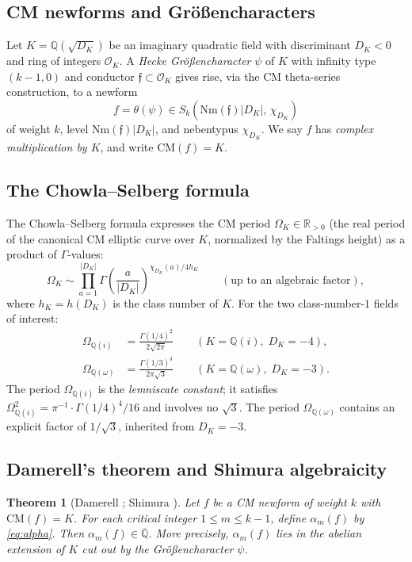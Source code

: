 \documentclass[10pt]{article}
\newtheorem{theorem}{Theorem}[section]
\theoremstyle{definition}
\newcommand{\Q}{\mathbb{Q}}
\newcommand{\R}{\mathbb{R}}
\newcommand{\OO}{\mathcal{O}}
\newcommand{\Nm}{\mathrm{Nm}}
\newcommand{\OmI}{\Omega_{\Q(i)}}
\newcommand{\OmW}{\Omega_{\Q(\omega)}}
\begin{document}
\subsection{CM newforms and Gr\"{o}{\ss}encharacters}

Let $K = \Q(\sqrt{D_K})$ be an imaginary quadratic field with discriminant $D_K < 0$
and ring of integers $\OO_K$.  A \emph{Hecke Gr\"{o}{\ss}encharacter} $\psi$ of $K$
with infinity type $(k-1, 0)$ and conductor $\mathfrak{f} \subset \OO_K$ gives rise,
via the CM theta-series construction, to a newform
\[
  f = \theta(\psi) \in S_k\!\left(\Nm(\mathfrak{f})|D_K|,\, \chi_{D_K}\right)
\]
of weight $k$, level $\Nm(\mathfrak{f})|D_K|$, and nebentypus $\chi_{D_K}$.
We say $f$ has \emph{complex multiplication by $K$}, and write $\mathrm{CM}(f) = K$.

\subsection{The Chowla--Selberg formula}

The Chowla--Selberg formula \cite{CS67} expresses the CM period $\Omega_K \in \R_{>0}$
(the real period of the canonical CM elliptic curve over $K$, normalized by the Faltings
height) as a product of $\Gamma$-values:
\[
  \Omega_K \sim \prod_{a=1}^{|D_K|}
    \Gamma\!\left(\frac{a}{|D_K|}\right)^{\chi_{D_K}(a)/4h_K}
    \qquad (\text{up to an algebraic factor}),
\]
where $h_K = h(D_K)$ is the class number of $K$.
For the two class-number-$1$ fields of interest:
\begin{align}
  \label{eq:OmegaQi}
  \OmI &= \frac{\Gamma(1/4)^2}{2\sqrt{2\pi}}
    \qquad (K = \Q(i),\; D_K = -4), \\
  \label{eq:OmegaQomega}
  \OmW &= \frac{\Gamma(1/3)^3}{2\pi\sqrt{3}}
    \qquad (K = \Q(\omega),\; D_K = -3).
\end{align}
The period $\OmI$ is the \emph{lemniscate constant}; it satisfies
$\OmI^2 = \pi^{-1}\cdot\Gamma(1/4)^4/16$ and involves no $\sqrt{3}$.
The period $\OmW$ contains an explicit factor of $1/\sqrt{3}$, inherited
from $D_K = -3$.

\subsection{Damerell's theorem and Shimura algebraicity}

\begin{theorem}[Damerell \cite{Dam70, Dam71}; Shimura \cite{Shi76}]
\label{thm:damerell}
Let $f$ be a CM newform of weight $k$ with $\mathrm{CM}(f) = K$.  For each
critical integer $1 \leq m \leq k-1$, define $\alpha_m(f)$ by \eqref{eq:alpha}.
Then $\alpha_m(f) \in \overline{\Q}$.  More precisely, $\alpha_m(f)$ lies in
the abelian extension of $K$ cut out by the Gr\"{o}{\ss}encharacter $\psi$.
\end{theorem}
\end{document}
